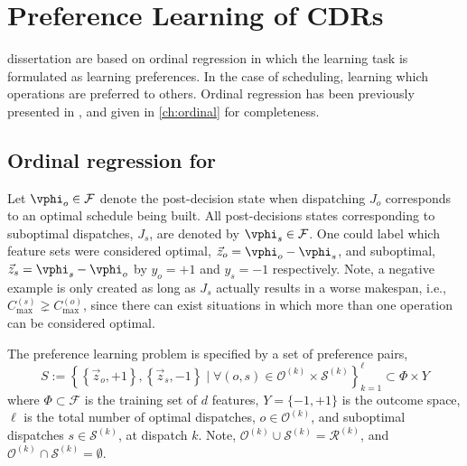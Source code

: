 
\chapter{Preference Learning of CDRs}\label{ch:prefmodels} 
 dissertation are based on ordinal regression in which the learning task is formulated as learning preferences. In the case of scheduling, learning which operations are preferred to others. Ordinal regression has been previously presented in \cite{Ru06:PPSN}, and given in \cref{ch:ordinal} for completeness. 

\section{Ordinal regression for \jsp}
Let $\vphi_{o}\in\mathcal{F}$ denote the post-decision state when dispatching $J_o$ corresponds to an optimal schedule being built. All post-decisions states corresponding to suboptimal dispatches, $J_s$, are denoted by $\vphi_{s}\in\mathcal{F}$. One could label which feature sets were considered optimal, $\vec{z}_{o}=\vphi_{o}-\vphi_{s}$, and suboptimal, $\vec{z}_{s}=\vphi_{s}-\vphi_{o}$ by $y_o=+1$ and $y_s=-1$ respectively. 
Note, a negative example is only created as long as $J_s$ actually results in a worse makespan, i.e., $C_{\max}^{(s)}\gneq C_{\max}^{(o)}$, since there can exist situations in which more than one operation can be considered optimal.

The preference learning problem is specified by a set of preference pairs,
\begin{equation}\label{eq:S:jsp}
S := \left\{\left\{\vec{z}_o,+1\right\},\left\{\vec{z}_s,-1\right\}
\;|\;\forall (o,s) \in \mathcal{O}^{(k)} \times \mathcal{S}^{(k)}
\right\}_{k=1}^{\ell} \subset \Phi\times Y 
\end{equation}
where $\Phi\subset\mathcal{F}$ is the training set of $d$ features, $Y=\{-1,+1\}$ is the outcome space, $\ell$ is the total number of optimal dispatches, $o\in\mathcal{O}^{(k)}$, and suboptimal dispatches $s\in \mathcal{S}^{(k)}$, at dispatch $k$. Note, $\mathcal{O}^{(k)}\cup\mathcal{S}^{(k)}=\mathcal{R}^{(k)}$, and $\mathcal{O}^{(k)}\cap\mathcal{S}^{(k)}=\emptyset$. 

